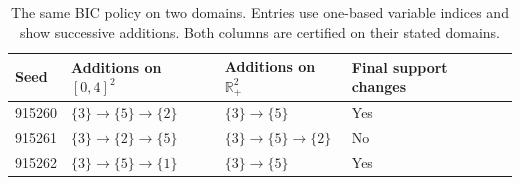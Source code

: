 \begin{table}[H]\centering\small
\begin{tabular}{llll}
\toprule
Seed & Additions on $[0,4]^2$ & Additions on $\mathbb R_+^2$ & Final support changes \\
\midrule
915260 & $\{3\}\to\{5\}\to\{2\}$ & $\{3\}\to\{5\}$ & Yes \\
915261 & $\{3\}\to\{2\}\to\{5\}$ & $\{3\}\to\{5\}\to\{2\}$ & No \\
915262 & $\{3\}\to\{5\}\to\{1\}$ & $\{3\}\to\{5\}$ & Yes \\
\bottomrule
\end{tabular}
\caption{The same BIC policy on two domains. Entries use one-based variable indices and show successive additions. Both columns are certified on their stated domains.}\label{tab:domainchange}
\end{table}

